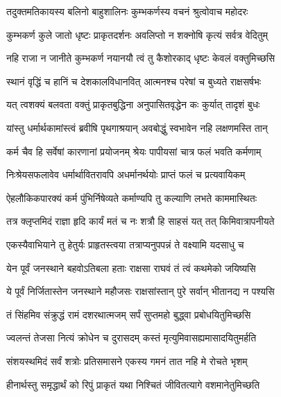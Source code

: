 
\twolineshloka
{तदुक्तमतिकायस्य बलिनो बाहुशालिनः}
{कुम्भकर्णस्य वचनं श्रुत्वोवाच महोदरः} %

\twolineshloka
{कुम्भकर्ण कुले जातो धृष्टः प्राकृतदर्शनः}
{अवलिप्तो न शक्नोषि कृत्यं सर्वत्र वेदितुम्} %

\twolineshloka
{नहि राजा न जानीते कुम्भकर्ण नयानयौ}
{त्वं तु कैशोरकाद् धृष्टः केवलं वक्तुमिच्छसि} %

\twolineshloka
{स्थानं वृद्धिं च हानिं च देशकालविधानवित्}
{आत्मनश्च परेषां च बुध्यते राक्षसर्षभः} %

\twolineshloka
{यत् त्वशक्यं बलवता वक्तुं प्राकृतबुद्धिना}
{अनुपासितवृद्धेन कः कुर्यात् तादृशं बुधः} %

\twolineshloka
{यांस्तु धर्मार्थकामांस्त्वं ब्रवीषि पृथगाश्रयान्}
{अवबोद्धुं स्वभावेन नहि लक्षणमस्ति तान्} %

\twolineshloka
{कर्म चैव हि सर्वेषां कारणानां प्रयोजनम्}
{श्रेयः पापीयसां चात्र फलं भवति कर्मणाम्} %

\twolineshloka
{निःश्रेयसफलावेव धर्मार्थावितरावपि}
{अधर्मानर्थयोः प्राप्तं फलं च प्रत्यवायिकम्} %

\twolineshloka
{ऐहलौकिकपारक्यं कर्म पुंभिर्निषेव्यते}
{कर्माण्यपि तु कल्याणि लभते काममास्थितः} %

\twolineshloka
{तत्र क्लृप्तमिदं राज्ञा हृदि कार्यं मतं च नः}
{शत्रौ हि साहसं यत् तत् किमिवात्रापनीयते} %

\twolineshloka
{एकस्यैवाभियाने तु हेतुर्यः प्राहृतस्त्वया}
{तत्राप्यनुपपन्नं ते वक्ष्यामि यदसाधु च} %

\twolineshloka
{येन पूर्वं जनस्थाने बहवोऽतिबला हताः}
{राक्षसा राघवं तं त्वं कथमेको जयिष्यसि} %

\twolineshloka
{ये पूर्वं निर्जितास्तेन जनस्थाने महौजसः}
{राक्षसांस्तान् पुरे सर्वान् भीतानद्य न पश्यसि} %

\twolineshloka
{तं सिंहमिव संक्रुद्धं रामं दशरथात्मजम्}
{सर्पं सुप्तमहो बुद्ध्वा प्रबोधयितुमिच्छसि} %

\twolineshloka
{ज्वलन्तं तेजसा नित्यं क्रोधेन च दुरासदम्}
{कस्तं मृत्युमिवासह्यमासादयितुमर्हति} %

\twolineshloka
{संशयस्थमिदं सर्वं शत्रोः प्रतिसमासने}
{एकस्य गमनं तात नहि मे रोचते भृशम्} %

\twolineshloka
{हीनार्थस्तु समृद्धार्थं को रिपुं प्राकृतं यथा}
{निश्चितं जीवितत्यागे वशमानेतुमिच्छति} %

